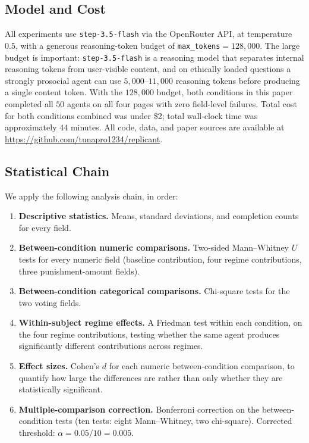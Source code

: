 \documentclass[12pt, a4paper]{article}
\begin{document}
\subsection{Model and Cost}

All experiments use \texttt{step-3.5-flash} via the OpenRouter API, at temperature $0.5$, with a generous reasoning-token budget of \texttt{max\_tokens}$=128{,}000$. The large budget is important: \texttt{step-3.5-flash} is a reasoning model that separates internal reasoning tokens from user-visible content, and on ethically loaded questions a strongly prosocial agent can use $5{,}000$--$11{,}000$ reasoning tokens before producing a single content token. With the $128{,}000$ budget, both conditions in this paper completed all $50$ agents on all four pages with zero field-level failures. Total cost for both conditions combined was under \$2; total wall-clock time was approximately $44$ minutes. All code, data, and paper sources are available at \url{https://github.com/tunapro1234/replicant}.

\subsection{Statistical Chain}

We apply the following analysis chain, in order:

\begin{enumerate}
  \item \textbf{Descriptive statistics.} Means, standard deviations, and completion counts for every field.
  \item \textbf{Between-condition numeric comparisons.} Two-sided Mann--Whitney $U$ tests for every numeric field (baseline contribution, four regime contributions, three punishment-amount fields).
  \item \textbf{Between-condition categorical comparisons.} Chi-square tests for the two voting fields.
  \item \textbf{Within-subject regime effects.} A Friedman test within each condition, on the four regime contributions, testing whether the same agent produces significantly different contributions across regimes.
  \item \textbf{Effect sizes.} Cohen's $d$ for each numeric between-condition comparison, to quantify how large the differences are rather than only whether they are statistically significant.
  \item \textbf{Multiple-comparison correction.} Bonferroni correction on the between-condition tests (ten tests: eight Mann--Whitney, two chi-square). Corrected threshold: $\alpha=0.05/10=0.005$.
\end{enumerate}
\end{document}
